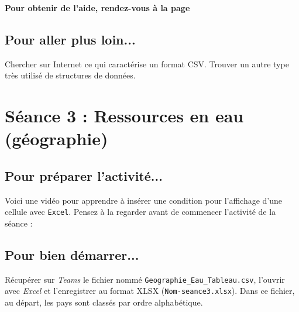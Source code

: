 

\textbf{Pour obtenir de l'aide, rendez-vous à la page \pageref{AideTableur03}}

\subsection{Pour aller plus loin...}

Chercher sur Internet ce qui caractérise un format CSV. Trouver un autre type très utilisé de structures de données.

\vfill
%
%
%
%



\pagebreak

\section{Séance 3 : Ressources en eau (géographie)}\label{ficheTableur4e3}

\subsection{Pour préparer l'activité...}

\vspace{10pt}

Voici une vidéo pour apprendre à insérer une condition pour l'affichage d'une cellule avec \texttt{Excel}. Pensez à la regarder avant de commencer l'activité de la séance :

\begin{center}
\end{center}

\vspace{12pt}

\subsection{Pour bien démarrer...}

\vspace{10pt}

Récupérer sur \emph{Teams} le fichier nommé \texttt{Geographie\_Eau\_Tableau.csv}, l'ouvrir avec \emph{Excel} et l'enregistrer au format XLSX (\texttt{Nom-seance3.xlsx}). Dans ce fichier, au départ, les pays sont classés par ordre alphabétique.

